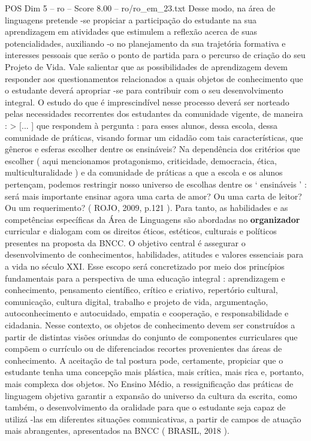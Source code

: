 \begin{textsample}{POS Dim 5 – ro – Score 8.00 – ro/ro\_em\_23.txt}
Desse modo, na área de linguagens pretende -se propiciar a participação do estudante na sua aprendizagem em atividades que estimulem a reflexão acerca de suas potencialidades, auxiliando -o no planejamento da sua trajetória formativa e interesses pessoais que serão o ponto de partida para o percurso de criação do seu Projeto de Vida.
Vale salientar que as possibilidades de aprendizagem devem responder aos questionamentos relacionados a quais objetos de conhecimento que o estudante deverá apropriar -se para contribuir com o seu desenvolvimento integral.
O estudo do que é imprescindível nesse processo deverá ser norteado pelas necessidades recorrentes dos estudantes da comunidade vigente, de maneira : > [... ] que respondem à pergunta : para esses alunos, dessa escola, dessa comunidade de práticas, visando formar um cidadão com tais características, que gêneros e esferas escolher dentre os ensináveis?
Na dependência dos critérios que escolher ( aqui mencionamos protagonismo, criticidade, democracia, ética, multiculturalidade ) e da comunidade de práticas a que a escola e os alunos pertençam, podemos restringir nosso universo de escolhas dentre os ‘ ensináveis ’ : será mais importante ensinar agora uma carta de amor?
Ou uma carta de leitor?
Ou um requerimento? ( ROJO, 2009, p.121 ).
Para tanto, as habilidades e as competências específicas da Área de Linguagens são abordadas no \textbf{organizador} curricular e dialogam com os direitos éticos, estéticos, culturais e políticos presentes na proposta da BNCC.
O objetivo central é assegurar o desenvolvimento de conhecimentos, habilidades, atitudes e valores essenciais para a vida no século XXI.
Esse escopo será concretizado por meio dos princípios fundamentais para a perspectiva de uma educação integral : aprendizagem e conhecimento, pensamento científico, crítico e criativo, repertório cultural, comunicação, cultura digital, trabalho e projeto de vida, argumentação, autoconhecimento e autocuidado, empatia e cooperação, e responsabilidade e cidadania.
Nesse contexto, os objetos de conhecimento devem ser construídos a partir de distintas visões oriundas do conjunto de componentes curriculares que compõem o currículo ou de diferenciados recortes provenientes das áreas de conhecimento.
A aceitação de tal postura pode, certamente, propiciar que o estudante tenha uma concepção mais plástica, mais crítica, mais rica e, portanto, mais complexa dos objetos.
No Ensino Médio, a ressignificação das práticas de linguagem objetiva garantir a expansão do universo da cultura da escrita, como também, o desenvolvimento da oralidade para que o estudante seja capaz de utilizá -las em diferentes situações comunicativas, a partir de campos de atuação mais abrangentes, apresentados na BNCC ( BRASIL, 2018 ).

\end{textsample}
